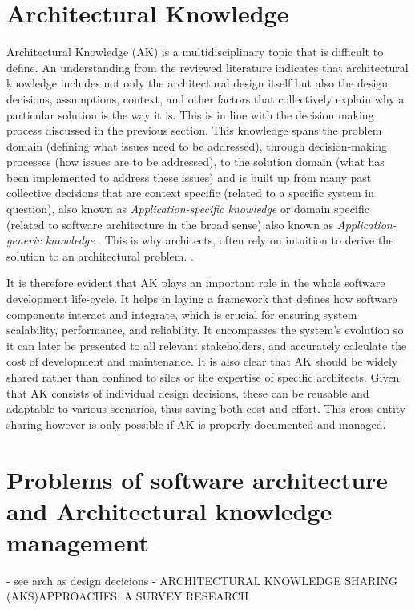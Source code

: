     \section{Architectural Knowledge}
        Architectural Knowledge (AK) is a multidisciplinary topic that is difficult to define. 
        An understanding from the reviewed literature \cite{architectural_knowledge_definitions} indicates that architectural knowledge includes not only the architectural design itself but also the design decisions, assumptions, context, and other factors that collectively explain why a particular solution is the way it is. This is in line with the decision making process discussed in the previous section. This knowledge spans the problem domain (defining what issues need to be addressed), through decision-making processes (how issues are to be addressed), to the solution domain (what has been implemented to address these issues) and is built up from many past collective decisions that are context specific (related to a specific system in question), also known as \textit{Application-specific knowledge} or domain specific (related to software architecture in the broad sense) also known as\textit{ Application-generic knowledge} \cite{Patterns+ArchDecisions}. This is why architects, often rely on intuition to derive the solution to an architectural problem. \cite{Patterns+ArchDecisions, archtitect_survey}.

        It is therefore evident that AK plays an important role in the whole software development life-cycle. It helps in laying a framework that defines how software components interact and integrate, which is crucial for ensuring system scalability, performance, and reliability. It encompasses the system's evolution so it can later be presented to all relevant stakeholders, and accurately calculate the cost of development and maintenance. It is also clear that AK should be widely shared rather than confined to silos or the expertise of specific architects. Given that AK consists of individual design decisions, these can be reusable and adaptable to various scenarios, thus saving both cost and effort. This cross-entity sharing however is only possible if AK is properly documented and managed.
        
    \section{Problems of software architecture and Architectural knowledge management}
    - see arch as design decicions
    - ARCHITECTURAL KNOWLEDGE SHARING (AKS)APPROACHES: A SURVEY RESEARCH
